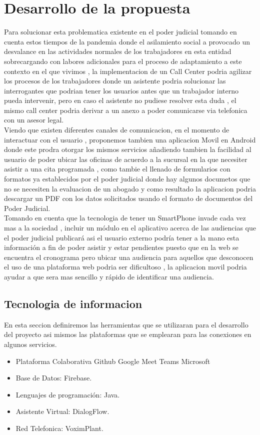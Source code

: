 \documentclass[twoside,twocolumn]{article}
\begin{document}
\section{Desarrollo de la propuesta}
Para solucionar esta problematica existente en el poder judicial tomando en cuenta estos tiempos de la pandemia donde el asilamiento social a provocado un desvalance en las actividades normales de los trabajadores en esta entidad sobrecargando con labores adicionales para el proceso de adaptamiento a este contexto en el que vivimos , la implementacion de un Call Center podria agilizar los procesos de los trabajadores donde un asistente podria solucionar las interrogantes que podrian tener los usuarios antes que un trabajador interno pueda intervenir, pero en caso el asistente no pudiese resolver esta duda , el mismo call center podria derivar a un anexo a poder comunicarse via telefonica con un asesor legal.
\\
Viendo que existen diferentes canales de comunicacion,  en el momento de interactuar con el usuario , proponemos tambien una aplicacion Movil en Android donde este prodra otorgar los mismos servicios añadiendo tambien la facilidad al usuario de poder ubicar las oficinas de acuerdo a la sucursal en la que necesiter asistir a una cita programada , como tambie  el llenado de formularios con formatos ya establecidos por el poder judicial donde hay algunos documetos que no se necesiten la evaluacion de un abogado y como resultado la aplicacion podria descargar un PDF con los datos solicitados usando el formato de documentos del Poder Judicial.
\\
Tomando en cuenta que la tecnologia de tener un SmartPhone invade cada vez mas a la sociedad , incluir un módulo en el aplicativo acerca de las audiencias que el poder judicial publicará asi el usuario externo podría tener a la mano esta información a fin de poder asistir y estar pendientes puesto que en la web se encuentra el cronograma pero ubicar una audiencia para aquellos que desconocen el uso de una plataforma web podria ser dificultoso , la aplicacion movil podria ayudar a que sera mas sencillo y rápido de identificar una audiencia.

\subsection{Tecnologia de informacion}
En esta seccion definiremos las herramientas que se utilizaran para el desarrollo del proyecto asi mismos las plataformas que se emplearan para las conexiones en algunos servicios.
\begin{itemize}
\item Plataforma Colaborativa
\subitem Github
\subitem Google Meet
\subitem Teams Microsoft
\item Base de Datos:
\subitem Firebase.
\item Lenguajes de programación:
\subitem Java.
\item Asistente Virtual:
\subitem DialogFlow.
\item Red Telefonica:
\subitem VoximPlant.
\end{itemize}
\end{document}
